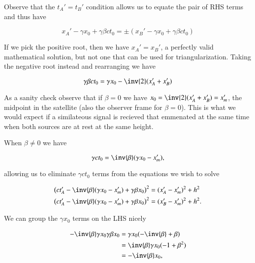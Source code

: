 Observe that the $t_A' = t_B'$ condition allows us to equate the pair of RHS terms and thus have

\begin{equation}\label{eqn:relElectroDynProblemSet2:1280}
x_A' - \gamma x_0 + \gamma \beta c t_0 = \pm (x_B' - \gamma x_0 + \gamma \beta c t_0 )
\end{equation}

If we pick the positive root, then we have $x_A' = x_B'$, a perfectly valid mathematical solution, but not one that can be used for triangularization.  Taking the negative root instead and rearranging we have

\begin{equation}\label{eqn:relElectroDynProblemSet2:1301}
\gamma \beta c t_0 = \gamma x_0 - \inv{2}(x_A' + x_B') 
\end{equation}

As a sanity check observe that if $\beta = 0$ we have $x_0 = \inv{2}(x_A' + x_B') = x_m'$, the midpoint in the satellite (also the observer frame for $\beta = 0$).  This is what we would expect if a similateous signal is recieved that emmenated at the same time when both sources are at rest at the same height.

When $\beta \ne 0$ we have

\begin{equation}\label{eqn:relElectroDynProblemSet2:1302}
\gamma c t_0 = \inv{\beta}(\gamma x_0 - x_m'),
\end{equation}

allowing us to eliminate $\gamma c t_0$ terms from the equations we wish to solve

\begin{align}\label{eqn:relElectroDynProblemSet2:1262}
\left( c t_A' - \inv{\beta}( \gamma x_0 - x_m') + \gamma \beta x_0 \right)^2 &= (x_A' - x_m')^2 + h^2 \\
\left( c t_A' - \inv{\beta}( \gamma x_0 - x_m') + \gamma \beta x_0 \right)^2 &= (x_B' - x_m')^2 + h^2.
\end{align}

We can group the $\gamma x_0$ terms on the LHS nicely

\begin{align*}
- \inv{\beta} \gamma x_0 \gamma \beta x_0
&=
\gamma x_0 ( - \inv{\beta} + \beta ) \\
&=
\inv{\beta} \gamma x_0 ( - 1 + \beta^2 ) \\
&=
-\inv{\beta} x_0,
\end{align*}

